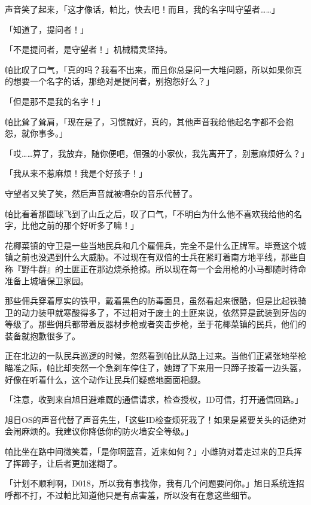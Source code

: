 声音笑了起来，「这才像话，帕比，快去吧！而且，我的名字叫守望者……」

「知道了，提问者！」

「不是提问者，是守望者！」机械精灵坚持。

帕比叹了口气，「真的吗？我看不出来，而且你总是问一大堆问题，所以如果你真的想要一个名字的话，那绝对是提问者，别抱怨好么？」

「但是那不是我的名字！」

帕比耸了耸肩，「现在是了，习惯就好，真的，其他声音我给他起名字都不会抱怨，就你事多。」

「哎……算了，我放弃，随你便吧，倔强的小家伙，我先离开了，别惹麻烦好么？」

「我从来不惹麻烦！我是个好孩子！」

守望者又笑了笑，然后声音就被嘈杂的音乐代替了。

帕比看着那圆球飞到了山丘之后，叹了口气，「不明白为什么他不喜欢我给他的名字，比他之前的那个好听多了嘛！」

\horizonline


花椰菜镇的守卫是一些当地民兵和几个雇佣兵，完全不是什么正牌军。毕竟这个城镇之前也没遇到什么大威胁。不过现在有双倍的士兵在紧盯着南方地平线，那些自称『野牛群』的土匪正在那边烧杀抢掠。所以现在每一个会用枪的小马都随时待命准备上城墙保卫家园。

那些佣兵穿着厚实的铁甲，戴着黑色的防毒面具，虽然看起来很酷，但是比起铁骑卫的动力装甲就寒酸得多了，不过相对于废土的土匪来说，依然算是武装到牙齿的等级了。那些佣兵都带着反器材步枪或者突击步枪，至于花椰菜镇的民兵，他们的装备就抱歉很多了。

正在北边的一队民兵巡逻的时候，忽然看到帕比从路上过来。当他们正紧张地举枪瞄准之际，帕比却突然一个急刹车停住了，她蹲了下来用一只蹄子按着一边头盔，好像在听着什么，这个动作让民兵们疑惑地面面相觑。

「注意，收到来自旭日避难厩的通信请求，检查授权，ID可信，打开通信回路。」

旭日OS的声音代替了声音先生，「这些ID检查烦死我了！如果是紧要关头的话绝对会闹麻烦的。我建议你降低你的防火墙安全等级。」

帕比坐在路中间微笑着，「是你啊蓝音，近来如何？」小雌驹对着走过来的卫兵挥了挥蹄子，让后者更加迷糊了。

「计划不顺利啊，D018，所以我有事找你，我有几个问题要问你。」旭日系统连招呼都不打，不过帕比知道他只是有点害羞，所以没有在意这些细节。

